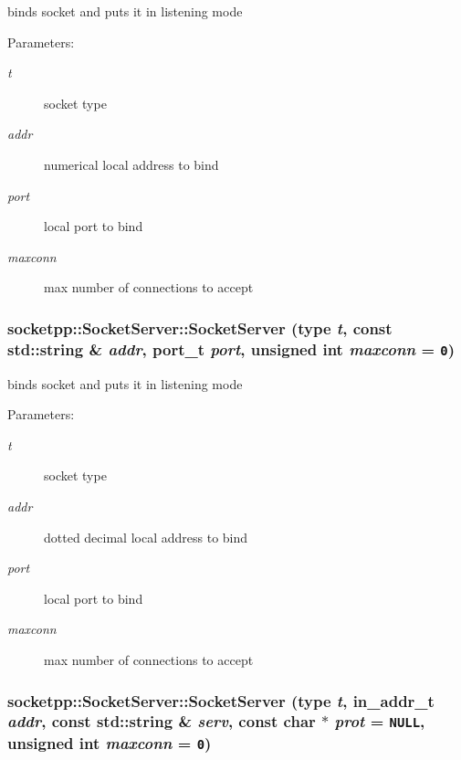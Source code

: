 binds socket and puts it in listening mode 

\begin{Desc}
\item[Parameters:]
\begin{description}
\item[{\em t}]socket type \item[{\em addr}]numerical local address to bind \item[{\em port}]local port to bind \item[{\em maxconn}]max number of connections to accept \end{description}
\end{Desc}
\hypertarget{classsocketpp_1_1SocketServer_2b43397fd614dc7953559d7372f1c6ca}{
\subsubsection[{SocketServer}]{\setlength{\rightskip}{0pt plus 5cm}socketpp::SocketServer::SocketServer ({\bf type} {\em t}, \/  const std::string \& {\em addr}, \/  {\bf port\_\-t} {\em port}, \/  unsigned int {\em maxconn} = {\tt 0})}}
\label{classsocketpp_1_1SocketServer_2b43397fd614dc7953559d7372f1c6ca}


binds socket and puts it in listening mode 

\begin{Desc}
\item[Parameters:]
\begin{description}
\item[{\em t}]socket type \item[{\em addr}]dotted decimal local address to bind \item[{\em port}]local port to bind \item[{\em maxconn}]max number of connections to accept \end{description}
\end{Desc}
\hypertarget{classsocketpp_1_1SocketServer_594f3a739f4cd053f9fd0512e42473be}{
\subsubsection[{SocketServer}]{\setlength{\rightskip}{0pt plus 5cm}socketpp::SocketServer::SocketServer ({\bf type} {\em t}, \/  in\_\-addr\_\-t {\em addr}, \/  const std::string \& {\em serv}, \/  const char $\ast$ {\em prot} = {\tt NULL}, \/  unsigned int {\em maxconn} = {\tt 0})}}
\label{classsocketpp_1_1SocketServer_594f3a739f4cd053f9fd0512e42473be}


